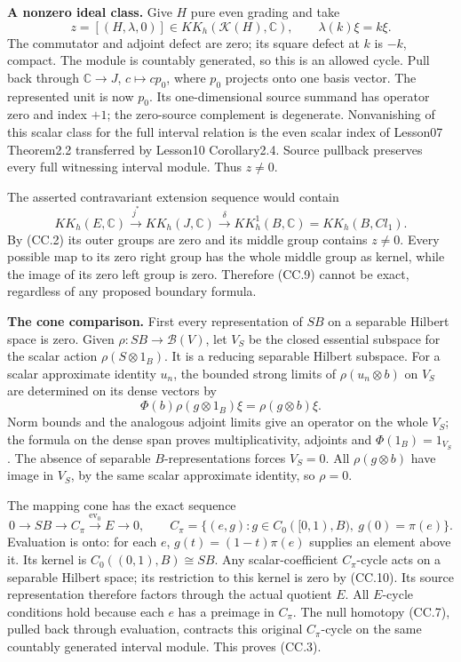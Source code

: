 \documentclass[
  11pt,
]{article}
\begin{document}
\textbf{A nonzero ideal class.} Give \(H\) pure even grading and take \[
 z=[(H,\lambda,0)]\in KK_h(\mathcal K(H),\mathbb C),
 \qquad \lambda(k)\xi=k\xi.
 \tag{CC.8}
\] The commutator and adjoint defect are zero; its square defect at
\(k\) is \(-k\), compact. The module is countably generated, so this is
an allowed cycle. Pull back through \(\mathbb C\to J\),
\(c\mapsto cp_0\), where \(p_0\) projects onto one basis vector. The
represented unit is now \(p_0\). Its one-dimensional source summand has
operator zero and index \(+1\); the zero-source complement is
degenerate. Nonvanishing of this scalar class for the full interval
relation is the even scalar index of Lesson07 Theorem2.2 transferred by
Lesson10 Corollary2.4. Source pullback preserves every full witnessing
interval module. Thus \(z\ne0\).

The asserted contravariant extension sequence would contain \[
 KK_h(E,\mathbb C)\xrightarrow{\,j^*\,}KK_h(J,\mathbb C)
 \xrightarrow{\,\delta\,}KK_h^1(B,\mathbb C)
 =KK_h(B,Cl_1).
 \tag{CC.9}
\] By (CC.2) its outer groups are zero and its middle group contains
\(z\ne0\). Every possible map to its zero right group has the whole
middle group as kernel, while the image of its zero left group is zero.
Therefore (CC.9) cannot be exact, regardless of any proposed boundary
formula.

\textbf{The cone comparison.} First every representation of \(SB\) on a
separable Hilbert space is zero. Given \(\rho:SB\to\mathcal B(V)\), let
\(V_S\) be the closed essential subspace for the scalar action
\(\rho(S\otimes1_B)\). It is a reducing separable Hilbert subspace. For
a scalar approximate identity \(u_n\), the bounded strong limits of
\(\rho(u_n\otimes b)\) on \(V_S\) are determined on its dense vectors by
\[
 \Phi(b)\rho(g\otimes1_B)\xi=\rho(g\otimes b)\xi.
 \tag{CC.10}
\] Norm bounds and the analogous adjoint limits give an operator on the
whole \(V_S\); the formula on the dense span proves multiplicativity,
adjoints and \(\Phi(1_B)=1_{V_S}\). The absence of separable
\(B\)-representations forces \(V_S=0\). All \(\rho(g\otimes b)\) have
image in \(V_S\), by the same scalar approximate identity, so
\(\rho=0\).

The mapping cone has the exact sequence \[
 0\longrightarrow SB\longrightarrow C_\pi
 \xrightarrow{\mathrm{ev}_0}E\longrightarrow0,\qquad
 C_\pi=\{(e,g):g\in C_0([0,1),B),\ g(0)=\pi(e)\}.
 \tag{CC.11}
\] Evaluation is onto: for each \(e\), \(g(t)=(1-t)\pi(e)\) supplies an
element above it. Its kernel is \(C_0((0,1),B)\cong SB\). Any
scalar-coefficient \(C_\pi\)-cycle acts on a separable Hilbert space;
its restriction to this kernel is zero by (CC.10). Its source
representation therefore factors through the actual quotient \(E\). All
\(E\)-cycle conditions hold because each \(e\) has a preimage in
\(C_\pi\). The null homotopy (CC.7), pulled back through evaluation,
contracts this original \(C_\pi\)-cycle on the same countably generated
interval module. This proves (CC.3).
\end{document}
